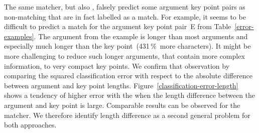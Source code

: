 The same \BertBase matcher, but also \RobertaBase, falsely predict some argument key point pairs as non-matching that are in fact labelled as a match.
For example, it seems to be difficult to predict a match for the argument key point pair~E from Table~\ref{error-examples}.
The argument from the example is longer than most arguments and especially much longer than the key point~(431\,\%~more characters).
It might be more challenging to reduce such longer arguments, that contain more complex information, to very compact key points.
We confirm that observation by comparing the squared classification error with respect to the absolute difference between argument and key point lengths.
Figure~\ref{classification-error-length} shows a tendency of higher error with the \BertBase when the length difference between the argument and key point is large.
Comparable results can be observed for the \RobertaBase matcher.
We therefore identify length difference as a second general problem for both approaches.
